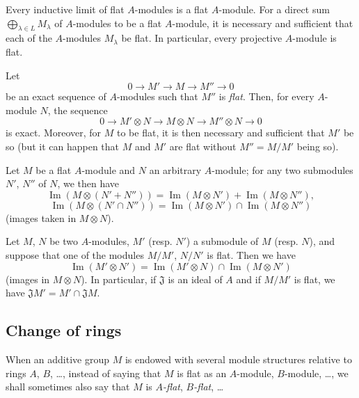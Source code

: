 \begin{env}[6.1.2]\label{0.6.1.2}
Every inductive limit of flat $A$-modules is a flat $A$-module. For
a direct sum $\bigoplus_{\lambda\in L}M_\lambda$ of $A$-modules to be
a flat $A$-module, it is necessary and sufficient that each of the $A$-modules
$M_\lambda$ be flat. In particular, every projective $A$-module is flat.

Let
\[
  0\longrightarrow M'\longrightarrow M\longrightarrow M''\longrightarrow 0
\]
be an exact sequence of $A$-modules such that $M''$ is \emph{flat}. Then, for
every $A$-module $N$, the sequence
\[
  0\longrightarrow M'\otimes N\longrightarrow M\otimes N
  \longrightarrow M''\otimes N\longrightarrow 0
\]
is exact. Moreover, for $M$ to be flat, it is then necessary and sufficient that
$M'$ be so (but it can happen that $M$ and $M'$ are flat without
$M''=M/M'$ being so).
\end{env}

\begin{env}[6.1.3]
\label{0.6.1.3}
Let $M$ be a flat $A$-module and $N$ an arbitrary $A$-module; for any two
submodules $N'$, $N''$ of $N$, we then have
\[
  \operatorname{Im}(M\otimes(N'+N''))
  =\operatorname{Im}(M\otimes N')+\operatorname{Im}(M\otimes N''),
\]
\[
  \operatorname{Im}(M\otimes(N'\cap N''))
  =\operatorname{Im}(M\otimes N')\cap\operatorname{Im}(M\otimes N'')
\]
(images taken in $M\otimes N$).
\end{env}

\begin{env}[6.1.4]
\label{0.6.1.4}
Let $M$, $N$ be two $A$-modules, $M'$ (resp. $N'$) a submodule of $M$
(resp. $N$), and suppose that one of the modules $M/M'$, $N/N'$ is flat.
Then we have
\[
  \operatorname{Im}(M'\otimes N')
  =\operatorname{Im}(M'\otimes N)\cap\operatorname{Im}(M\otimes N')
\]
(images in $M\otimes N$). In particular, if $\mathfrak{J}$ is an ideal
of $A$ and if $M/M'$ is flat, we have
$\mathfrak{J}M'=M'\cap\mathfrak{J}M$.
\end{env}

\subsection{Change of rings}
\label{subsection:0.6.2}

When an additive group $M$ is endowed with several module structures
relative to rings $A$, $B$, \ldots, instead of saying that $M$ is flat
as an $A$-module, $B$-module, \ldots, we shall sometimes also say that $M$
is \emph{$A$-flat}, \emph{$B$-flat}, \ldots

